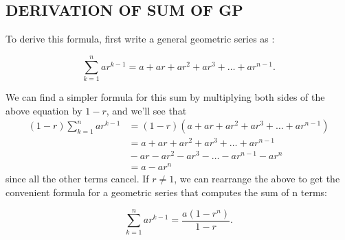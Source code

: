 \documentclass[11pt]{article}
\begin{document}
\subsection{DERIVATION OF SUM OF GP}
To derive this formula, first write a general geometric series as \cite{geo}:

$$\sum_{k=1}^{n} ar^{k-1} = a+ar +ar^{2}+ar^{3}+\ldots+ar^{n-1}.$$

We can find a simpler formula for this sum by multiplying both sides of the above equation by $1-r$, and we'll see that
\begin{equation*}
\begin{aligned} (1-r) \sum_{k=1}^{n} ar^{k-1} &{} = (1-r)(a + ar +ar^{2}+ar^{3}+\ldots+ar^{n-1}) \\ &{} = a + ar +ar^{2}+ar^{3}+\ldots+ar^{n-1} \\ &{}      - ar -ar^{2}-ar^{3}-\ldots-ar^{n-1} - ar^{n} \\ &{}= a - ar^{n} \end{aligned}
\end{equation*}
since all the other terms cancel. If $r \neq 1$, we can rearrange the above to get the convenient formula for a geometric series that computes the sum of n terms:

   $$ \sum_{k=1}^{n} ar^{k-1} = \frac{a(1-r^n)}{1-r}.$$ 
 
 
\end{document}
